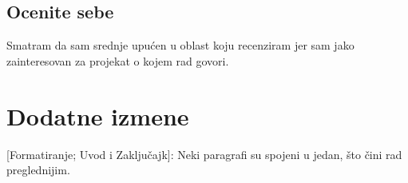 \documentclass[a4paper]{report}
\begin{document}
\section{Ocenite sebe}
Smatram da sam srednje upućen u oblast koju recenziram jer sam jako zainteresovan za projekat o kojem rad govori.



\chapter{Dodatne izmene}
[Formatiranje; Uvod i Zaključajk]: Neki paragrafi su spojeni u jedan, što čini rad preglednijim.
\end{document}
